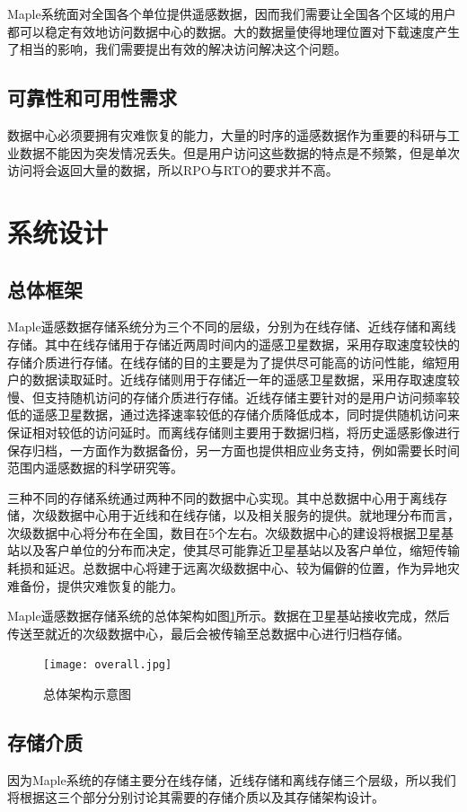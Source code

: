 \documentclass{article}
\begin{document}
Maple系统面对全国各个单位提供遥感数据，因而我们需要让全国各个区域的用户都可以稳定有效地访问数据中心的数据。大的数据量使得地理位置对下载速度产生了相当的影响，我们需要提出有效的解决访问解决这个问题。

\subsection{可靠性和可用性需求}
数据中心必须要拥有灾难恢复的能力，大量的时序的遥感数据作为重要的科研与工业数据不能因为突发情况丢失。但是用户访问这些数据的特点是不频繁，但是单次访问将会返回大量的数据，所以RPO与RTO的要求并不高。

\section{系统设计}
\subsection{总体框架}
Maple遥感数据存储系统分为三个不同的层级，分别为在线存储、近线存储和离线存储。其中在线存储用于存储近两周时间内的遥感卫星数据，采用存取速度较快的存储介质进行存储。在线存储的目的主要是为了提供尽可能高的访问性能，缩短用户的数据读取延时。近线存储则用于存储近一年的遥感卫星数据，采用存取速度较慢、但支持随机访问的存储介质进行存储。近线存储主要针对的是用户访问频率较低的遥感卫星数据，通过选择速率较低的存储介质降低成本，同时提供随机访问来保证相对较低的访问延时。而离线存储则主要用于数据归档，将历史遥感影像进行保存归档，一方面作为数据备份，另一方面也提供相应业务支持，例如需要长时间范围内遥感数据的科学研究等。

三种不同的存储系统通过两种不同的数据中心实现。其中总数据中心用于离线存储，次级数据中心用于近线和在线存储，以及相关服务的提供。就地理分布而言，次级数据中心将分布在全国，数目在5个左右。次级数据中心的建设将根据卫星基站以及客户单位的分布而决定，使其尽可能靠近卫星基站以及客户单位，缩短传输耗损和延迟。总数据中心将建于远离次级数据中心、较为偏僻的位置，作为异地灾难备份，提供灾难恢复的能力。

Maple遥感数据存储系统的总体架构如图\ref{overall}所示。数据在卫星基站接收完成，然后传送至就近的次级数据中心，最后会被传输至总数据中心进行归档存储。

\begin{figure}[H]
\centering 
\texttt{[image: overall.jpg]}
\caption{总体架构示意图}
\label{overall}
\end{figure}

\subsection{存储介质}
因为Maple系统的存储主要分在线存储，近线存储和离线存储三个层级，所以我们将根据这三个部分分别讨论其需要的存储介质以及其存储架构设计。
\end{document}
